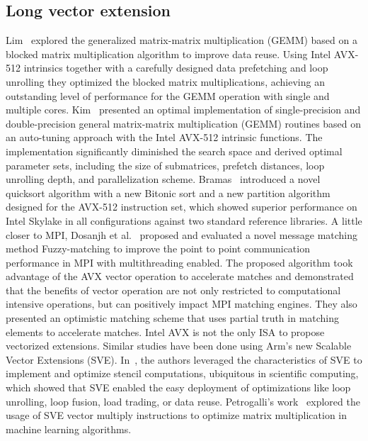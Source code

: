 \documentclass[5p,times,twocolumn]{elsarticle}
\newcommand{\sve}[0]{\textsc{SVE}\xspace}
\begin{document}
\subsection{Long vector extension}
Lim~\cite{Lim2018} explored the generalized matrix-matrix multiplication (GEMM) based on a blocked matrix multiplication algorithm to 
improve data reuse. Using Intel AVX-512 intrinsics together with a carefully designed data prefetching and loop unrolling they 
optimized the blocked matrix multiplications, achieving an outstanding level of performance for the GEMM operation with single and multiple cores.
%
Kim~\cite{Kim19} presented an optimal implementation of single-precision and double-precision general matrix-matrix multiplication (GEMM) routines based on an auto-tuning approach with the Intel AVX-512 intrinsic functions.
The implementation significantly diminished the search space and derived optimal parameter sets, including the size of submatrices, prefetch distances, loop unrolling depth, and parallelization scheme.
%
Bramas~\cite{Bramas2017} introduced a novel quicksort algorithm with a new Bitonic sort and a new
partition algorithm designed for the AVX-512
instruction set, which showed superior performance on Intel Skylake in
all configurations against two standard reference libraries.
%
A little closer to MPI, Dosanjh et al.~\cite{tag-match} proposed and evaluated a novel message matching method Fuzzy-matching
to improve the point to point communication performance in MPI with multithreading enabled.
The proposed algorithm took advantage of the AVX vector operation to accelerate matches
and demonstrated that the benefits of vector operation are not only restricted to computational intensive operations, but can positively impact MPI matching engines. They also presented an optimistic
matching scheme that uses partial truth in matching elements
to accelerate matches.
%
Intel AVX is not the only ISA to propose vectorized extensions. Similar studies have been done using Arm's new Scalable Vector Extensions (SVE).
In~\cite{sve-stencil}, the authors leveraged the characteristics of \sve to implement and optimize stencil computations, ubiquitous in scientific computing, which showed
that \sve enabled the easy deployment of optimizations like loop unrolling,
loop fusion, load trading, or data reuse.
%
Petrogalli's work~\cite{sveml} explored the usage of SVE vector multiply
instructions to optimize matrix multiplication in machine learning algorithms. %
\end{document}
